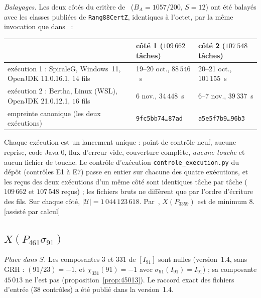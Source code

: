 \documentclass[11pt,a4paper]{amsart}
\theoremstyle{plain}
\theoremstyle{definition}
\newcommand{\XA}{X(P_{3359})}
\newcommand{\XB}{X(P_{461}\sigma_{91})}
\newcommand{\st}[1]{\textup{\textsf{\small[#1]}}}
\newcommand{\ASS}{\st{assisté par calcul}}
\begin{document}
\emph{Balayages.} Les deux côtés du critère de~\cite[th.~4.6]{Gau26} ($B_A=1057/200$, $S=12$) ont été balayés avec les classes publiées de \texttt{Rang88CertZ}, identiques à l'octet, par la même invocation que dans~\cite{Gau26} :

\begin{center}\small
\begin{tabular}{>{\raggedright\arraybackslash}p{5.6cm}ll}
\toprule
& côté 1 ($109\,662$ tâches) & côté 2 ($107\,548$ tâches) \\
\midrule
exécution 1 : SpiraleG, Windows~11, OpenJDK 11.0.16.1, $14$ fils & 19--20 oct., $88\,546$~s & 20--21 oct., $101\,155$~s \\
exécution 2 : Bertha, Linux (WSL), OpenJDK 21.0.12.1, $16$ fils & 6 nov., $34\,448$~s & 6--7 nov., $39\,337$~s \\
\midrule
empreinte canonique (les deux exécutions) & \texttt{9fc5bb74\dots87ad} & \texttt{a5e5f7b9\dots96b3} \\
\bottomrule
\end{tabular}
\end{center}

Chaque exécution est un lancement unique : point de contrôle neuf, aucune reprise, code Java $0$, flux d'erreur vide, couverture complète, \emph{aucune touche} et aucun fichier de touche. Le contrôle d'exécution \texttt{controle\_execution.py} du dépôt (contrôles E1 à E7) passe en entier sur chacune des quatre exécutions, et les reçus des deux exécutions d'un même côté sont identiques tâche par tâche ($109\,662$ et $107\,548$ reçus) ; les fichiers bruts ne diffèrent que par l'ordre d'écriture des fils. Sur chaque côté, $|\mathcal U|=1\,044\,123\,618$. Par~\cite[th.~4.6]{Gau26}, $\XA$ est de minimum $8$. \ASS

\subsection{\texorpdfstring{$\XB$}{X(P461 sigma91)}}\label{subsec:B}
\emph{Place dans $S$.} Les composantes $3$ et $331$ de $[I_{91}]$ sont nulles (version~1.4, sans GRH : $(91/23)=-1$, et $\chi_{331}(91)=-1$ avec $\sigma_{91}(I_{91})=I_{91}$) ; sa composante $45\,013$ ne l'est pas (proposition~\ref{prop:45013}). Le raccord exact des fichiers d'entrée ($38$ contrôles) a été publié dans la version~1.4.
\end{document}
